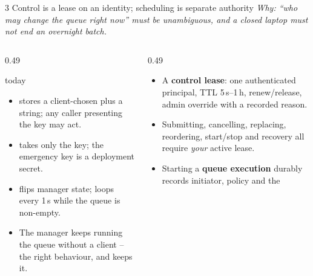 \begin{frame}{3 \quad Control is a lease on an identity; scheduling is separate authority}
    {\footnotesize\itshape Why: ``who may change the queue right now'' must be unambiguous, and a closed laptop
    must not end an overnight batch.}
    \vspace{0.05cm}
    \begin{columns}[T]
        \begin{column}{0.49\textwidth}
            \begin{alertblock}{\legacy{} today}
                \footnotesize
                \begin{itemize}
                    \item {} stores a client-chosen  plus a  string;
                          any caller presenting the key may act. 
                    \item {} takes only the key; the emergency key is a deployment secret.
                    \item {} flips manager state;  loops every 1\,s
                          while the queue is non-empty. 
                    \item The manager keeps running the queue without a client -- the right behaviour,
                          and \vtwo{} keeps it.
                \end{itemize}
            \end{alertblock}
        \end{column}
        \begin{column}{0.49\textwidth}
            \begin{block}{\vtwo{}}
                \footnotesize
                \begin{itemize}
                    \item A \textbf{control lease}: one authenticated principal, TTL 5\,s--1\,h,
                          renew/release, admin override with a recorded reason.
                    \item Submitting, cancelling, replacing, reordering, start/stop and recovery
                          all require \emph{your} active lease.
                    \item Starting a \textbf{queue execution} durably records initiator, policy and the

\end{itemize}
\end{block}
\end{column}
\end{columns}
\end{frame}
